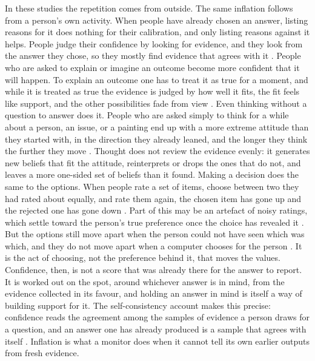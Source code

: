 \documentclass[11pt]{article}
\begin{document}
In these studies the repetition comes from outside. The same inflation follows from a person's own activity. When people have already chosen an answer, listing reasons for it does nothing for their calibration, and only listing reasons against it helps. People judge their confidence by looking for evidence, and they look from the answer they chose, so they mostly find evidence that agrees with it \citep{koriat1980reasons}. People who are asked to explain or imagine an outcome become more confident that it will happen. To explain an outcome one has to treat it as true for a moment, and while it is treated as true the evidence is judged by how well it fits, the fit feels like support, and the other possibilities fade from view \citep{koehler1991explanation}. Even thinking without a question to answer does it. People who are asked simply to think for a while about a person, an issue, or a painting end up with a more extreme attitude than they started with, in the direction they already leaned, and the longer they think the further they move \citep{tesser1978self}. Thought does not review the evidence evenly: it generates new beliefs that fit the attitude, reinterprets or drops the ones that do not, and leaves a more one-sided set of beliefs than it found. Making a decision does the same to the options. When people rate a set of items, choose between two they had rated about equally, and rate them again, the chosen item has gone up and the rejected one has gone down \citep{brehm1956postdecision}. Part of this may be an artefact of noisy ratings, which settle toward the person's true preference once the choice has revealed it \citep{chen2010how}. But the options still move apart when the person could not have seen which was which, and they do not move apart when a computer chooses for the person \citep{sharot2010decisions}. It is the act of choosing, not the preference behind it, that moves the values. Confidence, then, is not a score that was already there for the answer to report. It is worked out on the spot, around whichever answer is in mind, from the evidence collected in its favour, and holding an answer in mind is itself a way of building support for it. The self-consistency account makes this precise: confidence reads the agreement among the samples of evidence a person draws for a question, and an answer one has already produced is a sample that agrees with itself \citep{koriat2012self}. Inflation is what a monitor does when it cannot tell its own earlier outputs from fresh evidence.
\end{document}
